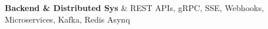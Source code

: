 \textbf{Backend \& Distributed Sys} & REST APIs, gRPC, SSE, Webhooks, Microservices, Kafka, Redis Asynq \\
